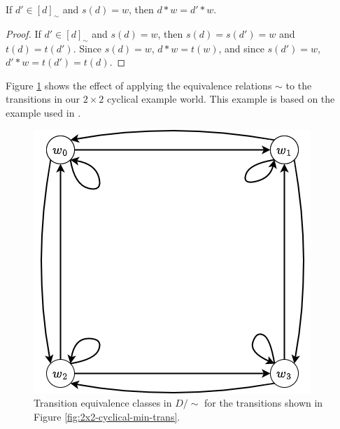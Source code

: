 \begin{proposition}\label{prp:equivalence-class-on-vertex}
    If $d' \in [d]_{\sim}$ and $s(d)=w$, then $d * w = d' * w$.
\end{proposition}\begin{proof}
    If $d' \in [d]_{\sim}$ and $s(d)=w$, then $s(d)=s(d')=w$ and $t(d)=t(d')$.
    Since $s(d)=w$, $d * w = t(w)$, and since $s(d')=w$, $d' * w = t(d') = t(d)$.
\end{proof}


Figure \ref{fig:2x2-cyclical-min-trans-equivalence} shows the effect of applying the equivalence relations $\sim$ to the transitions in our $2 \times 2$ cyclical example world.
This example is based on the example used in \cite{Higgins2018}.

\begin{figure}[H]
    \centering
    \includegraphics[width=0.5\linewidth]{ToUse/PaperDiscards/Images/2x2-cyclical-min-trans-equivalence.png}
    \caption{Transition equivalence classes in $D/\sim$ for the transitions shown in Figure \ref{fig:2x2-cyclical-min-trans}.}
    \label{fig:2x2-cyclical-min-trans-equivalence}
\end{figure}


